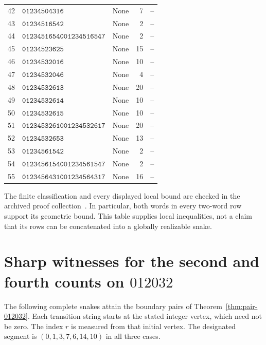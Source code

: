 \documentclass[11pt,a4paper]{article}
\theoremstyle{definition}
\theoremstyle{remark}
\begin{document}
\begin{longtable}{r p{} p{} r r}
42 & \(\mathtt{01234504316}\) & None & 7 & --\\
43 & \(\mathtt{01234516542}\) & None & 2 & --\\
44 & \(\mathtt{01234516540}\)\newline \(\mathtt{01234516547}\) & None & 2 & --\\
45 & \(\mathtt{01234523625}\) & None & 15 & --\\
46 & \(\mathtt{01234532016}\) & None & 10 & --\\
47 & \(\mathtt{01234532046}\) & None & 4 & --\\
48 & \(\mathtt{01234532613}\) & None & 20 & --\\
49 & \(\mathtt{01234532614}\) & None & 10 & --\\
50 & \(\mathtt{01234532615}\) & None & 10 & --\\
51 & \(\mathtt{01234532610}\)\newline \(\mathtt{01234532617}\) & None & 20 & --\\
52 & \(\mathtt{01234532653}\) & None & 13 & --\\
53 & \(\mathtt{01234561542}\) & None & 2 & --\\
54 & \(\mathtt{01234561540}\)\newline \(\mathtt{01234561547}\) & None & 2 & --\\
55 & \(\mathtt{01234564310}\)\newline \(\mathtt{01234564317}\) & None & 16 & --\\
\end{longtable}
\endgroup
The finite classification and every displayed local bound are checked in
the archived proof collection~\cite{historycreditarchive}. In particular,
both words in every two-word row support its geometric bound. This table
supplies local inequalities, not a claim that its rows can be concatenated
into a globally realizable snake.

\section{Sharp witnesses for the second and fourth counts on $012032$}\label{app:pair-012032-witnesses}

The following complete snakes attain the boundary pairs of Theorem~\ref{thm:pair-012032}. Each transition string starts at the stated integer vertex, which need not be zero. The index $r$ is measured from that initial vertex. The designated segment is $(0,1,3,7,6,14,10)$ in all three cases.
\end{document}
